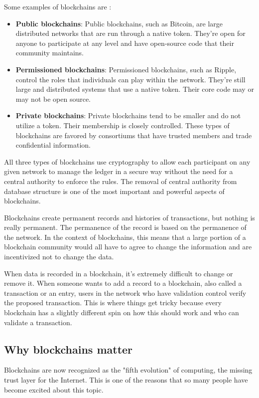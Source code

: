 \documentclass[MSE,Master,english]{twbook}%
\begin{document}
Some examples of blockchains are \cite{blockchainDummies}:

\begin{itemize}
  \item \textbf{Public blockchains}: Public blockchains, such as Bitcoin, are large distributed networks that are run through a native token. They're open for anyone to participate at any level and have open-source code that their community maintains.
  \item \textbf{Permissioned blockchains}: Permissioned blockchains, such as Ripple, control the roles that individuals can play within the network. They're still large and distributed systems that use a native token. Their core code may or may not be open source.
  \item \textbf{Private blockchains}: Private blockchains tend to be smaller and do not utilize a token. Their membership is closely controlled. These types of blockchains are favored by consortiums that have trusted members and trade confidential information.
\end{itemize}

All three types of blockchains use cryptography to allow each participant on any given network to manage the ledger in a secure way without the need for a central authority to enforce the rules. The removal of central authority from database structure is one of the most important and powerful aspects of blockchains.

Blockchains create permanent records and histories of transactions, but nothing is really permanent. The permanence of the record is based on the permanence of the network. In the context of blockchains, this means that a large portion of a blockchain community would all have to agree to change the information and are incentivized not to change the data. 

When data is recorded in a blockchain, it's extremely difficult to change or remove it. When someone wants to add a record to a blockchain, also called a transaction or an entry, users in the network who have validation control verify the proposed transaction. This is where things get tricky because every blockchain has a slightly different spin on how this should work and who can validate a transaction.

\subsection{Why blockchains matter}

Blockchains are now recognized as the "fifth evolution"\cite{blockchainDummies} of computing, the missing trust layer for the Internet. This is one of the reasons that so many people have become excited about this topic. 
\end{document}

